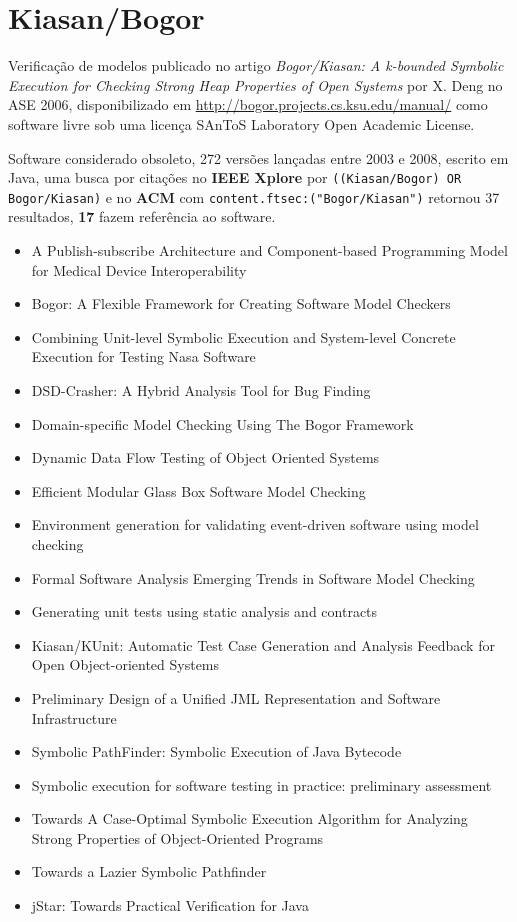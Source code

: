 \section{Kiasan/Bogor}

Verificação de modelos
publicado no artigo {\it Bogor/Kiasan: A k-bounded Symbolic Execution for Checking Strong Heap Properties of Open Systems}
por X. Deng
no ASE 2006,
disponibilizado em \url{http://bogor.projects.cs.ksu.edu/manual/}
como software livre
sob uma licença SAnToS Laboratory Open Academic License.

Software considerado obsoleto,
272 versões lançadas
entre 2003 e 2008,
escrito em Java,
uma busca por citações no {\bf IEEE Xplore} por
\texttt{((Kiasan/Bogor) OR Bogor/Kiasan)}
e no {\bf ACM} com
\texttt{content.ftsec:("Bogor/Kiasan")}
retornou
37 resultados,
{\bf 17} fazem referência ao software.

\begin{itemize}
\item A Publish-subscribe Architecture and Component-based Programming Model for Medical Device Interoperability
\item Bogor: A Flexible Framework for Creating Software Model Checkers
\item Combining Unit-level Symbolic Execution and System-level Concrete Execution for Testing Nasa Software
\item DSD-Crasher: A Hybrid Analysis Tool for Bug Finding
\item Domain-specific Model Checking Using The Bogor Framework
\item Dynamic Data Flow Testing of Object Oriented Systems
\item Efficient Modular Glass Box Software Model Checking
\item Environment generation for validating event-driven software using model checking
\item Formal Software Analysis Emerging Trends in Software Model Checking
\item Generating unit tests using static analysis and contracts
\item Kiasan/KUnit: Automatic Test Case Generation and Analysis Feedback for Open Object-oriented Systems
\item Preliminary Design of a Unified JML Representation and Software Infrastructure
\item Symbolic PathFinder: Symbolic Execution of Java Bytecode
\item Symbolic execution for software testing in practice: preliminary assessment
\item Towards A Case-Optimal Symbolic Execution Algorithm for Analyzing Strong Properties of Object-Oriented Programs
\item Towards a Lazier Symbolic Pathfinder
\item jStar: Towards Practical Verification for Java
\end{itemize}


